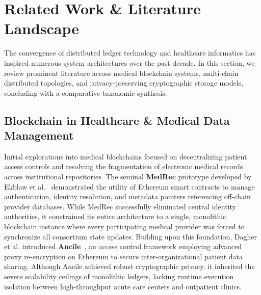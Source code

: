 \section{Related Work \& Literature Landscape}
\label{sec:related_work}

The convergence of distributed ledger technology and healthcare informatics has inspired numerous system architectures over the past decade. In this section, we review prominent literature across medical blockchain systems, multi-chain distributed topologies, and privacy-preserving cryptographic storage models, concluding with a comparative taxonomic synthesis.

\subsection{Blockchain in Healthcare \& Medical Data Management}
Initial explorations into medical blockchains focused on decentralizing patient access controls and resolving the fragmentation of electronic medical records across institutional repositories. The seminal \textbf{MedRec} prototype developed by Ekblaw et al.~\cite{ekblaw2016medrec} demonstrated the utility of Ethereum smart contracts to manage authentication, identity resolution, and metadata pointers referencing off-chain provider databases. While MedRec successfully eliminated central identity authorities, it constrained its entire architecture to a single, monolithic blockchain instance where every participating medical provider was forced to synchronize all consortium state updates. Building upon this foundation, Dagher et al. introduced \textbf{Ancile}~\cite{dagher2018ancile}, an access control framework employing advanced proxy re-encryption on Ethereum to secure inter-organizational patient data sharing. Although Ancile achieved robust cryptographic privacy, it inherited the severe scalability ceilings of monolithic ledgers, lacking runtime execution isolation between high-throughput acute care centers and outpatient clinics. 

